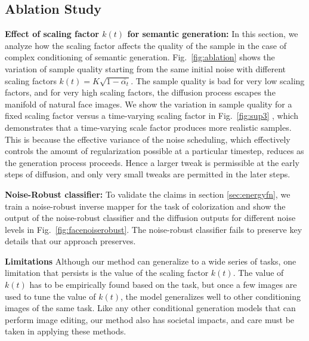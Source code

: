 \documentclass[10pt,twocolumn,letterpaper]{article}
\begin{document}
\subsection{Ablation Study}
\label{sec:ablation}
\noindent\textbf{Effect of scaling factor $k(t)$ for semantic generation:} In this section, we analyze how the scaling factor affects the quality of the sample in the case of complex conditioning of semantic generation. Fig.~\ref{fig:ablation} shows the variation of sample quality starting from the same initial noise with different scaling factors $k(t) = K\sqrt{1-\bar{\alpha_t}}$. The sample quality is bad for very low scaling factors, and for very high scaling factors, the diffusion process escapes the manifold of natural face images. We show the variation in sample quality for a fixed scaling factor versus a time-varying scaling factor in Fig.~\ref{fig:sup3} , which demonstrates that a time-varying scale factor produces more realistic samples. This is because the effective variance of the noise scheduling, which effectively controls the amount of regularization possible at a particular timestep, reduces as the generation process proceeds. Hence a larger tweak is permissible at the early steps of diffusion, and only very small tweaks are permitted in the later steps.

\noindent\textbf{Noise-Robust classifier:} To validate the claims in section \ref{sec:energyfn}, we train a noise-robust inverse mapper for the task of colorization and show the output of the noise-robust classifier and the diffusion outputs for different noise levels in Fig.~\ref{fig:facenoiserobust}. The noise-robust classifier fails to preserve key details that our approach preserves.


\noindent\textbf{Limitations}
Although our method can generalize to a wide series of tasks, one limitation that persists is the value of the scaling factor $k(t)$. The value of $k(t)$ has to be empirically found based on the task, but once a few images are used to tune the value of $k(t)$, the model generalizes well to other conditioning images of the same task. Like any other conditional generation models that can perform image editing, our method also has societal impacts, and care must be taken in applying these methods.




\vspace{-2mm}
\end{document}
